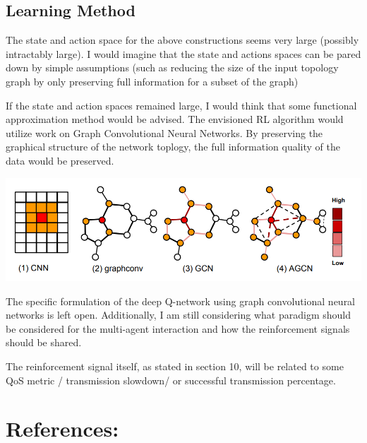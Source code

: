 \documentclass[11pt]{article}
\makeatletter
\def\maxwidth{\ifdim\Gin@nat@width>\linewidth\linewidth
    \else\Gin@nat@width\fi}
\makeatother
\begin{document}
\subsection{Learning Method}

The state and action space for the above constructions seems very large (possibly
intractably large). I would imagine that the state and actions spaces can be pared 
down by simple assumptions (such as reducing the size of the input topology graph
by only preserving full information for a subset of the graph)

If the state and action spaces remained large, I would think that some functional 
approximation method would be advised. The envisioned RL algorithm would utilize
work on Graph Convolutional Neural Networks. By preserving the graphical structure of the network toplogy, the full information quality of the data would 
be preserved. 

\includegraphics[width=.8\maxwidth]{graph-conv-net.png}

The specific formulation of the deep Q-network using graph convolutional neural 
networks is left open. Additionally, I am still considering what paradigm should
be considered for the multi-agent interaction and how the reinforcement signals
should be shared. 

The reinforcement signal itself, as stated in section 10, will be related to some
QoS metric / transmission slowdown/ or successful transmission percentage.



    \hypertarget{random-thoughts}{%
\pagebreak
\section{References:}\label{references}}
\end{document}
